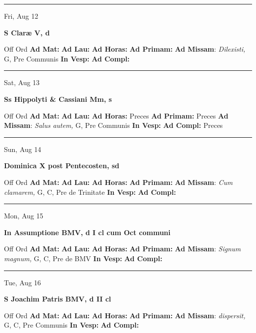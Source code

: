 \documentclass[letterpaper, 10pt]{article}
\begin{document}
\hrule
\begin{center}
Fri, Aug 12
\end{center}\textbf{ \large S Claræ V, \textnormal{\normalsize d}}
\begin{justify}
Off Ord
\textbf{Ad Mat: }
\textbf{Ad Lau: }
\textbf{Ad Horas: }
\textbf{Ad Primam: }
\textbf{Ad Missam}: \textit{Dilexisti,} G, Pre Communis
\textbf{In Vesp: }
\textbf{Ad Compl: }\end{justify}



\hrule
\begin{center}
Sat, Aug 13
\end{center}\textbf{ \large Ss Hippolyti \& Cassiani Mm, \textnormal{\normalsize s}}
\begin{justify}
Off Ord
\textbf{Ad Mat: }
\textbf{Ad Lau: }
\textbf{Ad Horas: }Preces
\textbf{Ad Primam: }Preces
\textbf{Ad Missam}: \textit{Salus autem,} G, Pre Communis
\textbf{In Vesp: }
\textbf{Ad Compl: }Preces\end{justify}



\hrule
\begin{center}
Sun, Aug 14
\end{center}\textbf{ \large Dominica X post Pentecosten, \textnormal{\normalsize sd}}
\begin{justify}
Off Ord
\textbf{Ad Mat: }
\textbf{Ad Lau: }
\textbf{Ad Horas: }
\textbf{Ad Primam: }
\textbf{Ad Missam}: \textit{Cum clamarem,} G, C, Pre de Trinitate
\textbf{In Vesp: }
\textbf{Ad Compl: }\end{justify}



\hrule
\begin{center}
Mon, Aug 15
\end{center}\textbf{ \large In Assumptione BMV, \textnormal{\normalsize d I cl cum Oct communi}}
\begin{justify}
Off Ord
\textbf{Ad Mat: }
\textbf{Ad Lau: }
\textbf{Ad Horas: }
\textbf{Ad Primam: }
\textbf{Ad Missam}: \textit{Signum magnum,} G, C, Pre de BMV
\textbf{In Vesp: }
\textbf{Ad Compl: }\end{justify}



\hrule
\begin{center}
Tue, Aug 16
\end{center}\textbf{ \large S Joachim Patris BMV, \textnormal{\normalsize d II cl}}
\begin{justify}
Off Ord
\textbf{Ad Mat: }
\textbf{Ad Lau: }
\textbf{Ad Horas: }
\textbf{Ad Primam: }
\textbf{Ad Missam}: \textit{dispersit,} G, C, Pre Communis
\textbf{In Vesp: }
\textbf{Ad Compl: }\end{justify}
\end{document}
